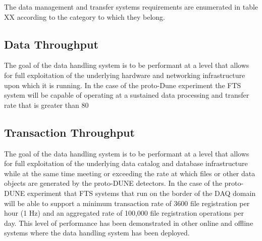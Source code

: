 \documentclass[pdftex,12pt,letter]{article}
\begin{document}
The data management and transfer systems requirements are enumerated in table XX according to the category to which they belong.

\subsection{Data Throughput}

The goal of the data handling system is to be performant at a level that allows for full exploitation of the underlying hardware and networking infrastructure upon which  it is running.  In the case of the proto-Dune experiment the FTS system will be capable of operating at a sustained data processing and transfer rate that is greater than 80%

\subsection{Transaction Throughput}

The goal of the data handling system is to be performant at a level that allows for full exploitation of the underlying data catalog and database infrastructure while at the same time meeting or exceeding the rate at which files or other data objects are generated by the proto-DUNE detectors.  In the case of the proto-DUNE experiment that FTS systems that run on the border of the DAQ domain will be able to support a minimum transaction rate of 3600 file registration per hour (1 Hz) and an aggregated rate of 100,000 file registration operations per day.  This level of performance has been demonstrated in other online and offline systems where the data handling system has been deployed.
\end{document}

